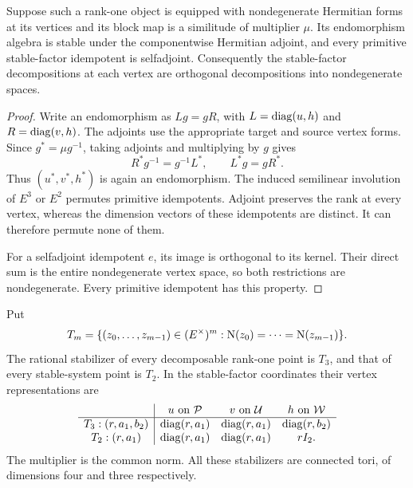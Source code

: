 \begin{lemma}\label{m2:rat:selfadjoint-idempotents}
Suppose such a rank-one object is equipped with nondegenerate
Hermitian forms at its vertices and its block map is a
similitude of multiplier $\mu$.  Its endomorphism algebra
is stable under the componentwise Hermitian adjoint, and
every primitive stable-factor idempotent is selfadjoint.
Consequently the stable-factor decompositions at each
vertex are orthogonal decompositions into nondegenerate
spaces.
\end{lemma}

\begin{proof}
Write an endomorphism as $Lg=gR$, with
$L=\operatorname{diag}(u,h)$ and $R=\operatorname{diag}(v,h)$.  The adjoints use the
appropriate target and source vertex forms.  Since
$g^*=\mu g^{-1}$, taking adjoints and multiplying by $g$
gives
\[
 R^*g^{-1}=g^{-1}L^*,\qquad L^*g=gR^*.
\]
Thus $(u^*,v^*,h^*)$ is again an endomorphism.  The induced
semilinear involution of $E^3$ or $E^2$ permutes primitive
idempotents.  Adjoint preserves the rank at every vertex,
whereas the dimension vectors of these idempotents are
distinct.  It can therefore permute none of them.

For a selfadjoint idempotent $e$, its image is orthogonal
to its kernel. Their direct sum is the entire
nondegenerate vertex space, so both restrictions are
nondegenerate. Every primitive idempotent has this property.
\end{proof}

\begin{proposition}\label{m2:rat:rankone-stabilizers}
Put
\[
 T_m=\{(z_0,\ldots,z_{m-1})\in(E^\times)^m:
          \operatorname{N}(z_0)=\cdots=\operatorname{N}(z_{m-1})\}.
\]
The rational stabilizer of every decomposable rank-one
point is $T_3$, and that of every stable-system point is
$T_2$.  In the stable-factor coordinates their vertex
representations are
\begin{equation}\label{m2:rat:rankone-embeddings}
 \begin{array}{c|ccc}
 &u\text{ on }\mathcal P&v\text{ on }\mathcal U
                       &h\text{ on }\mathcal W\\ \hline
 T_3:(r,a_1,b_2)&\operatorname{diag}(r,a_1)&\operatorname{diag}(r,a_1)&\operatorname{diag}(r,b_2)\\
 T_2:(r,a_1)&\operatorname{diag}(r,a_1)&\operatorname{diag}(r,a_1)&rI_2.
 \end{array}
\end{equation}
The multiplier is the common norm.  All these stabilizers
are connected tori, of dimensions four and three respectively.
\end{proposition}

